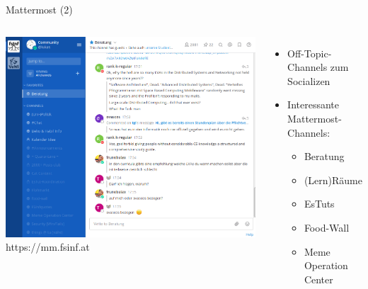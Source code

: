 \documentclass{beamer}
\begin{document}
\begin{frame}{Mattermost (2)}
  \begin{columns}
      \centering
      \includegraphics[width=\textwidth]{mattermost.png}
      https://mm.fsinf.at
      \begin{itemize}
        \item Off-Topic-Channels zum Socializen
        \item Interessante Mattermost-Channels:
            \begin{itemize}
                \item Beratung
                \item (Lern)Räume
                \item EsTuts
                \item Food-Wall
                \item Meme Operation Center
            \end{itemize}
      \end{itemize}
  \end{columns}
\end{frame}
\end{document}
